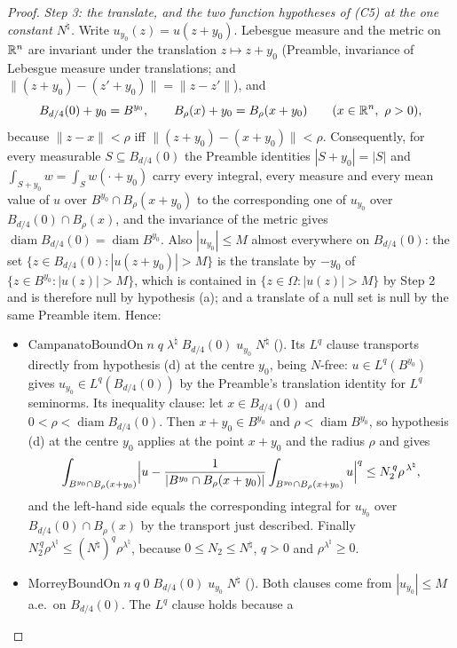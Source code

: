 \begin{proof}
\emph{Step 3: the translate, and the two function hypotheses of \textup{(C5)} at
the one constant $N^\natural$.}  Write $u_{y_0}(z)=u(z+y_0)$.  Lebesgue measure
and the metric on $\mathbb{R}^n$ are invariant under the translation
$z\mapsto z+y_0$ (Preamble, invariance of Lebesgue measure under translations;
and $\|(z+y_0)-(z'+y_0)\|=\|z-z'\|$), and
\[
B_{d/4}(0)+y_0=B^{y_0},\qquad B_\rho(x)+y_0=B_\rho(x+y_0)
\qquad(x\in\mathbb{R}^n,\ \rho>0),
\]
because $\|z-x\|<\rho$ iff $\|(z+y_0)-(x+y_0)\|<\rho$.  Consequently, for every
measurable $S\subseteq B_{d/4}(0)$ the Preamble identities $|S+y_0|=|S|$ and
$\int_{S+y_0}w=\int_Sw(\cdot+y_0)$ carry every integral, every measure and
every mean value of $u$ over $B^{y_0}\cap B_\rho(x+y_0)$ to the corresponding
one of $u_{y_0}$ over $B_{d/4}(0)\cap B_\rho(x)$, and the invariance of the
metric gives
$\operatorname{diam}B_{d/4}(0)=\operatorname{diam}B^{y_0}$.  Also
$|u_{y_0}|\le M$ almost everywhere on $B_{d/4}(0)$: the set
$\{z\in B_{d/4}(0):|u(z+y_0)|>M\}$ is the translate by $-y_0$ of
$\{z\in B^{y_0}:|u(z)|>M\}$, which is contained in
$\{z\in\Omega:|u(z)|>M\}$ by Step 2 and is therefore null by hypothesis (a); and
a translate of a null set is null by the same Preamble item.  Hence:
\begin{itemize}
\item $\mathrm{CampanatoBoundOn}\;n\;q\;\lambda^\natural\;B_{d/4}(0)\;u_{y_0}\;
  N^\natural$ ().  Its $L^q$ clause transports
  directly from hypothesis (d) at the centre $y_0$, being $N$-free: $u\in
  L^q(B^{y_0})$ gives $u_{y_0}\in L^q(B_{d/4}(0))$ by the Preamble's
  translation identity for $L^q$ seminorms.  Its inequality clause: let
  $x\in B_{d/4}(0)$ and $0<\rho<\operatorname{diam}B_{d/4}(0)$.  Then
  $x+y_0\in B^{y_0}$ and $\rho<\operatorname{diam}B^{y_0}$, so hypothesis (d) at
  the centre $y_0$ applies at the point $x+y_0$ and the radius $\rho$ and gives
  \[
  \int_{B^{y_0}\cap B_\rho(x+y_0)}\Bigl|u-\frac1{|B^{y_0}\cap
  B_\rho(x+y_0)|}\int_{B^{y_0}\cap B_\rho(x+y_0)}u\Bigr|^q
  \le N_2^{\,q}\rho^{\,\lambda^\natural},
  \]
  and the left-hand side equals the corresponding integral for $u_{y_0}$ over
  $B_{d/4}(0)\cap B_\rho(x)$ by the transport just described.  Finally
  $N_2^{\,q}\rho^{\lambda^\natural}\le(N^\natural)^q\rho^{\lambda^\natural}$,
  because $0\le N_2\le N^\natural$, $q>0$ and $\rho^{\lambda^\natural}\ge0$.
\item $\mathrm{MorreyBoundOn}\;n\;q\;0\;B_{d/4}(0)\;u_{y_0}\;N^\natural$
  ().  Both clauses come from
  $|u_{y_0}|\le M$ a.e.\ on $B_{d/4}(0)$.  The $L^q$ clause holds because a

\end{itemize}
\end{proof}
